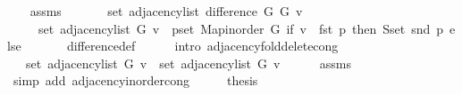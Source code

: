 \begin{isabellebody}
\ \ \isamarkupfalse%
\ assms{\isacharparenleft}{\kern0pt}{}{\isacharparenright}{\kern0pt}\isanewline
\ \ \isamarkupfalse%
\isanewline
\ \ \ \ {\isachardoublequoteopen}set\ {\isacharparenleft}{\kern0pt}adjacency{\isacharunderscore}{\kern0pt}list\ {\isacharparenleft}{\kern0pt}difference\ G{}\ G{}{\isacharparenright}{\kern0pt}\ v{\isacharparenright}{\kern0pt}\ {\isacharequal}{\kern0pt}\isanewline
\ \ \ \ \ set\ {\isacharparenleft}{\kern0pt}adjacency{\isacharunderscore}{\kern0pt}list\ G{}\ v{\isacharparenright}{\kern0pt}\ {\isacharminus}{\kern0pt}\ {\isacharparenleft}{\kern0pt}{\isasymUnion}p{\isasymin}set\ {\isacharparenleft}{\kern0pt}Map{\isacharunderscore}{\kern0pt}inorder\ G{}{\isacharparenright}{\kern0pt}{\isachardot}{\kern0pt}\ if\ v\ {\isacharequal}{\kern0pt}\ fst\ p\ then\ S{\isachardot}{\kern0pt}set\ {\isacharparenleft}{\kern0pt}snd\ p{\isacharparenright}{\kern0pt}\ else\ {\isacharbraceleft}{\kern0pt}{\isacharbraceright}{\kern0pt}{\isacharparenright}{\kern0pt}{\isachardoublequoteclose}\isanewline
\ \ \ \ \isamarkupfalse%
\ difference{\isacharunderscore}{\kern0pt}def\isanewline
\ \ \ \ \isamarkupfalse%
\ {\isacharparenleft}{\kern0pt}intro\ adjacency{\isacharunderscore}{\kern0pt}fold{\isacharunderscore}{\kern0pt}delete{\isacharunderscore}{\kern0pt}{}{\isacharunderscore}{\kern0pt}cong{\isacharparenright}{\kern0pt}\isanewline
\ \ \isamarkupfalse%
\ \isamarkupfalse%
\ {\isachardoublequoteopen}{\isachardot}{\kern0pt}{\isachardot}{\kern0pt}{\isachardot}{\kern0pt}\ {\isacharequal}{\kern0pt}\ set\ {\isacharparenleft}{\kern0pt}adjacency{\isacharunderscore}{\kern0pt}list\ G{}\ v{\isacharparenright}{\kern0pt}\ {\isacharminus}{\kern0pt}\ set\ {\isacharparenleft}{\kern0pt}adjacency{\isacharunderscore}{\kern0pt}list\ G{}\ v{\isacharparenright}{\kern0pt}{\isachardoublequoteclose}\isanewline
\ \ \ \ \isamarkupfalse%
\ assms{\isacharparenleft}{\kern0pt}{}{\isacharparenright}{\kern0pt}\isanewline
\ \ \ \ \isamarkupfalse%
\ {\isacharparenleft}{\kern0pt}simp\ add{\isacharcolon}{\kern0pt}\ adjacency{\isacharunderscore}{\kern0pt}inorder{\isacharunderscore}{\kern0pt}cong{\isacharparenright}{\kern0pt}\isanewline
\ \ \isamarkupfalse%
\ \isamarkupfalse%
\ {\isacharquery}{\kern0pt}thesis\isanewline
\ \ \ \ \isacommand{{\isachardot}{\kern0pt}}\isamarkupfalse%
\isanewline
{}\isamarkupfalse%

\end{isabellebody}
